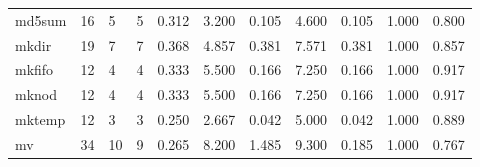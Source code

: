 \begin{longtable}{lp{1.8cm}p{1.8cm}p{1.8cm}p{1.8cm}p{1.8cm}p{1.8cm}p{1.8cm}p{1.8cm}p{1.8cm}p{1.8cm}}
md5sum    &                           16 &                  5 &                                 5 &                                      0.312 &                                  3.200 &                                        0.105 &                             4.600 &                                   0.105 &                              1.000 &                                              0.800 \\
mkdir     &                           19 &                  7 &                                 7 &                                      0.368 &                                  4.857 &                                        0.381 &                             7.571 &                                   0.381 &                              1.000 &                                              0.857 \\
mkfifo    &                           12 &                  4 &                                 4 &                                      0.333 &                                  5.500 &                                        0.166 &                             7.250 &                                   0.166 &                              1.000 &                                              0.917 \\
mknod     &                           12 &                  4 &                                 4 &                                      0.333 &                                  5.500 &                                        0.166 &                             7.250 &                                   0.166 &                              1.000 &                                              0.917 \\
mktemp    &                           12 &                  3 &                                 3 &                                      0.250 &                                  2.667 &                                        0.042 &                             5.000 &                                   0.042 &                              1.000 &                                              0.889 \\
mv        &                           34 &                 10 &                                 9 &                                      0.265 &                                  8.200 &                                        1.485 &                             9.300 &                                   0.185 &                              1.000 &                                              0.767 \\

\end{longtable}
